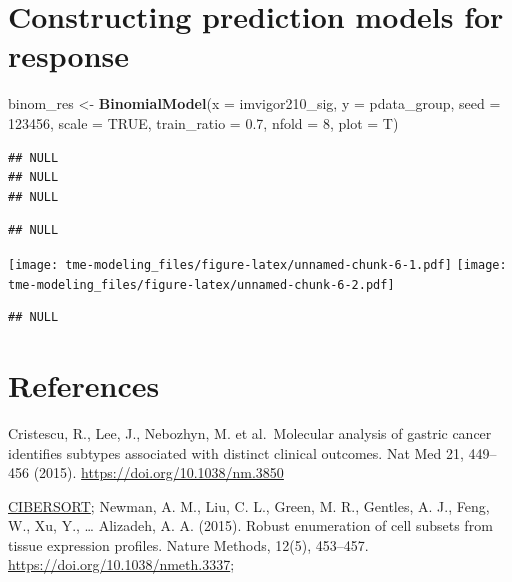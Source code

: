 \documentclass[
  12pt,
]{book}
\newenvironment{Shaded}{\begin{snugshade}}{\end{snugshade}}
\newcommand{\AttributeTok}[1]{\textcolor[rgb]{0.13,0.29,0.53}{#1}}
\newcommand{\ConstantTok}[1]{\textcolor[rgb]{0.56,0.35,0.01}{#1}}
\newcommand{\DecValTok}[1]{\textcolor[rgb]{0.00,0.00,0.81}{#1}}
\newcommand{\FloatTok}[1]{\textcolor[rgb]{0.00,0.00,0.81}{#1}}
\newcommand{\FunctionTok}[1]{\textcolor[rgb]{0.13,0.29,0.53}{\textbf{#1}}}
\newcommand{\NormalTok}[1]{#1}
\newcommand{\OtherTok}[1]{\textcolor[rgb]{0.56,0.35,0.01}{#1}}
\begin{document}
\hypertarget{constructing-prediction-models-for-response}{%
\section{Constructing prediction models for response}\label{constructing-prediction-models-for-response}}

\begin{Shaded}
\begin{Highlighting}[]
\NormalTok{binom\_res }\OtherTok{\textless{}{-}} \FunctionTok{BinomialModel}\NormalTok{(}\AttributeTok{x           =}\NormalTok{ imvigor210\_sig, }
                           \AttributeTok{y           =}\NormalTok{ pdata\_group, }
                           \AttributeTok{seed        =} \DecValTok{123456}\NormalTok{, }
                           \AttributeTok{scale       =} \ConstantTok{TRUE}\NormalTok{, }
                           \AttributeTok{train\_ratio =} \FloatTok{0.7}\NormalTok{, }
                           \AttributeTok{nfold       =} \DecValTok{8}\NormalTok{, }
                           \AttributeTok{plot        =}\NormalTok{ T)}
\end{Highlighting}
\end{Shaded}

\begin{verbatim}
## NULL
## NULL
## NULL
\end{verbatim}

\begin{verbatim}
## NULL
\end{verbatim}

\texttt{[image: tme-modeling\_files/figure-latex/unnamed-chunk-6-1.pdf]} \texttt{[image: tme-modeling\_files/figure-latex/unnamed-chunk-6-2.pdf]}

\begin{verbatim}
## NULL
\end{verbatim}

\hypertarget{references-6}{%
\section{References}\label{references-6}}

Cristescu, R., Lee, J., Nebozhyn, M. et al.~Molecular analysis of gastric cancer identifies subtypes associated with distinct clinical outcomes. Nat Med 21, 449--456 (2015). \url{https://doi.org/10.1038/nm.3850}

\href{https://cibersort.stanford.edu/}{CIBERSORT}; Newman, A. M., Liu, C. L., Green, M. R., Gentles, A. J., Feng, W., Xu, Y., \ldots{} Alizadeh, A. A. (2015). Robust enumeration of cell subsets from tissue expression profiles. Nature Methods, 12(5), 453--457. \url{https://doi.org/10.1038/nmeth.3337};
\end{document}
